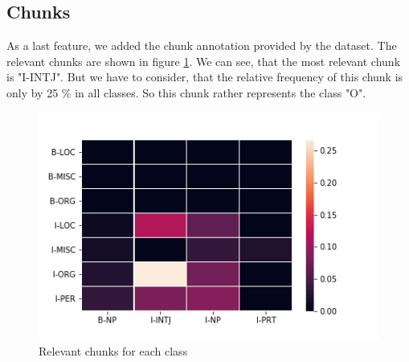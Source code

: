 \documentclass[noindent, nochapname]{tudexercise}
\begin{document}
		\subsection{Chunks}
			As a last feature, we added the chunk annotation provided by the dataset. The relevant chunks are shown in figure \ref{fig:chunks_per_class}. We can see, that the most relevant chunk is "I-INTJ". But we have to consider, that the relative frequency of this chunk is only by 25 \% in all classes. So this chunk rather represents the class "O". 
			
			\begin{figure}[h]
				\centering
				\includegraphics[scale=0.6]{img/chunks_per_class.png}
				\caption{Relevant chunks for each class}
				\label{fig:chunks_per_class}
			\end{figure}
\end{document}
